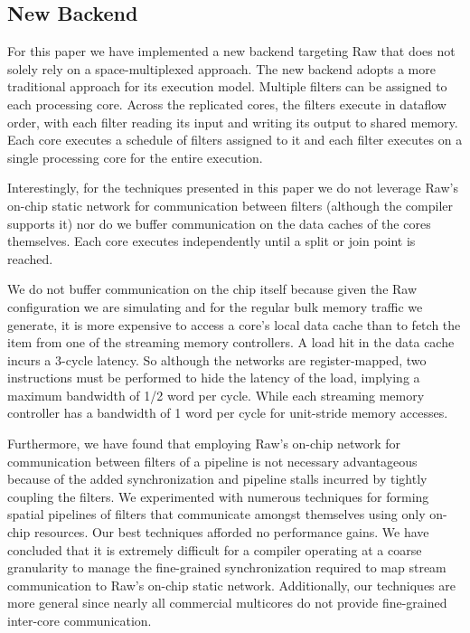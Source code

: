 \subsection{New Backend}
For this paper we have implemented a new backend targeting Raw that
does not solely rely on a space-multiplexed approach.  The new backend
adopts a more traditional approach for its execution model. Multiple
filters can be assigned to each processing core.  Across the
replicated cores, the filters execute in dataflow order, with each
filter reading its input and writing its output to shared memory. Each
core executes a schedule of filters assigned to it and each filter
executes on a single processing core for the entire execution.

Interestingly, for the techniques presented in this paper we do not
leverage Raw's on-chip static network for communication between
filters (although the compiler supports it) nor do we buffer
communication on the data caches of the cores themselves. Each core
executes independently until a split or join point is reached. 

We do not buffer communication on the chip itself because given the
Raw configuration we are simulating and for the regular bulk memory
traffic we generate, it is more expensive to access a core's local
data cache than to fetch the item from one of the streaming memory
controllers. A load hit in the data cache incurs a 3-cycle latency.
So although the networks are register-mapped, two instructions must be
performed to hide the latency of the load, implying a maximum
bandwidth of 1/2 word per cycle.  While each streaming memory
controller has a bandwidth of 1 word per cycle for unit-stride memory
accesses.

Furthermore, we have found that employing Raw's on-chip network for
communication between filters of a pipeline is not necessary
advantageous because of the added synchronization and pipeline stalls
incurred by tightly coupling the filters.  We experimented with
numerous techniques for forming spatial pipelines of filters that
communicate amongst themselves using only on-chip resources.  Our best
techniques afforded no performance gains.  We have concluded that it
is extremely difficult for a compiler operating at a coarse
granularity to manage the fine-grained synchronization required to map
stream communication to Raw's on-chip static network.  Additionally,
our techniques are more general since nearly all commercial multicores
do not provide fine-grained inter-core communication.

